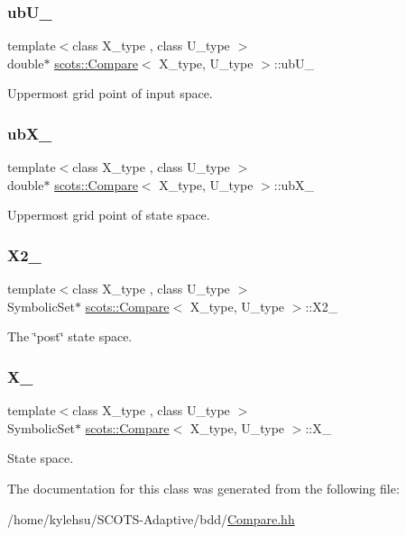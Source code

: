\subsubsection{\texorpdfstring{ub\+U\+\_\+}{ubU\_}}
{\footnotesize\ttfamily template$<$class X\+\_\+type , class U\+\_\+type $>$ \\
double$\ast$ \hyperlink{classscots_1_1Compare}{scots\+::\+Compare}$<$ X\+\_\+type, U\+\_\+type $>$\+::ub\+U\+\_\+}

Uppermost grid point of input space. \mbox{\label{classscots_1_1Compare_a1ce31ce906f325470edb135b65a3a01a}} 
\subsubsection{\texorpdfstring{ub\+X\+\_\+}{ubX\_}}
{\footnotesize\ttfamily template$<$class X\+\_\+type , class U\+\_\+type $>$ \\
double$\ast$ \hyperlink{classscots_1_1Compare}{scots\+::\+Compare}$<$ X\+\_\+type, U\+\_\+type $>$\+::ub\+X\+\_\+}

Uppermost grid point of state space. \mbox{\label{classscots_1_1Compare_a3f1ba24992e2dfe24358087aeecb5a75}} 
\subsubsection{\texorpdfstring{X2\+\_\+}{X2\_}}
{\footnotesize\ttfamily template$<$class X\+\_\+type , class U\+\_\+type $>$ \\
Symbolic\+Set$\ast$ \hyperlink{classscots_1_1Compare}{scots\+::\+Compare}$<$ X\+\_\+type, U\+\_\+type $>$\+::X2\+\_\+}

The \char`\"{}post\char`\"{} state space. \mbox{\label{classscots_1_1Compare_a4d0bb95aefd7ffeda946bd79a8170825}} 
\subsubsection{\texorpdfstring{X\+\_\+}{X\_}}
{\footnotesize\ttfamily template$<$class X\+\_\+type , class U\+\_\+type $>$ \\
Symbolic\+Set$\ast$ \hyperlink{classscots_1_1Compare}{scots\+::\+Compare}$<$ X\+\_\+type, U\+\_\+type $>$\+::X\+\_\+}

State space. 

The documentation for this class was generated from the following file\+:\begin{DoxyCompactItemize}
\item 
/home/kylehsu/\+S\+C\+O\+T\+S-\/\+Adaptive/bdd/\hyperlink{Compare_8hh}{Compare.\+hh}\end{DoxyCompactItemize}
